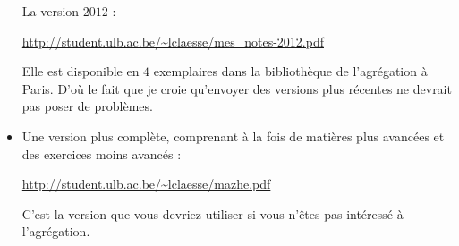 \begin{itemize}
        La version \( 2012\) :  
        \begin{center}
        \url{http://student.ulb.ac.be/~lclaesse/mes_notes-2012.pdf}
        \end{center}

        Elle est disponible en \( 4\) exemplaires dans la bibliothèque de l'agrégation à Paris. D'où le fait que je croie qu'envoyer des versions plus récentes ne devrait pas poser de problèmes.

    \item

        Une version plus complète, comprenant à la fois de matières plus avancées et des exercices moins avancés : 
        \begin{center}
        \url{http://student.ulb.ac.be/~lclaesse/mazhe.pdf}
        \end{center}

        C'est la version que vous devriez utiliser si vous n'êtes pas intéressé à l'agrégation.

\end{itemize}


\vfill

\LogoEtLicence
\clearpage
